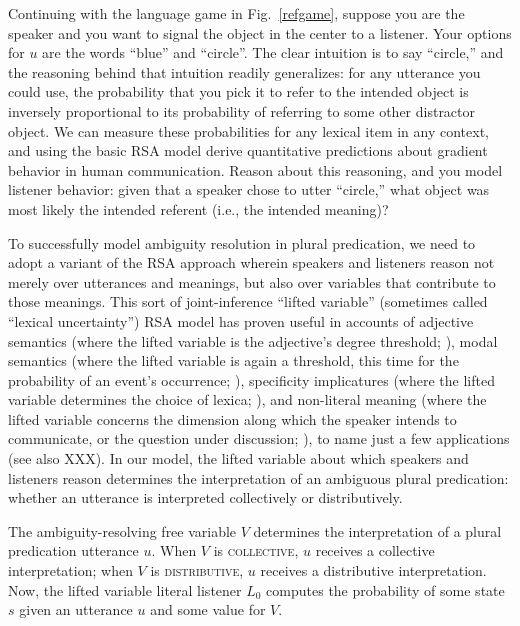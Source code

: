 \documentclass[linguex]{sp}
\begin{document}
Continuing with the language game in Fig.~\ref{refgame}, suppose you are the speaker and you want to signal the object in the center to a listener. Your options for $u$ are the words ``blue'' and ``circle''. The clear intuition is to say ``circle,'' and the reasoning behind that intuition readily generalizes: for any utterance you could use, the probability that you pick it to refer to the intended object is inversely proportional to its probability of referring to some other distractor object. We can measure these probabilities for any lexical item in any context, and using the basic RSA model derive quantitative predictions about gradient behavior in human communication. Reason about this reasoning, and you model listener behavior: given that a speaker chose to utter ``circle,'' what object was most likely the intended referent (i.e., the intended meaning)?  %

To successfully model ambiguity resolution in plural predication, we need to adopt a variant of the RSA approach wherein speakers and listeners reason not merely over utterances and meanings, but also over variables that contribute to those meanings. This sort of joint-inference ``lifted variable'' (sometimes called ``lexical uncertainty'') RSA model has proven useful in accounts of adjective semantics (where the lifted variable is the adjective's degree threshold; \citealp{lassitergoodman2013}), modal semantics (where the lifted variable is again a threshold, this time for the probability of an event's occurrence; \citealp{lassitergoodman2015}), specificity implicatures (where the lifted variable determines the choice of lexica; \citealp{bergenetal2012}), and non-literal meaning (where the lifted variable concerns the dimension along which the speaker intends to communicate, or the question under discussion; \citealp{kaoetal2014}), to name just a few applications (see also XXX). In our model, the lifted variable about which speakers and listeners reason determines the interpretation of an ambiguous plural predication: whether an utterance is interpreted collectively or distributively.

The ambiguity-resolving free variable $V$ determines the interpretation of a plural predication utterance $u$. When $V$ is \textsc{collective}, $u$ receives a collective interpretation; when $V$ is \textsc{distributive}, $u$ receives a distributive interpretation. Now, the lifted variable literal listener $L_{0}$ computes the probability of some state $s$ given an utterance $u$ and some value for $V$. 
\end{document}
